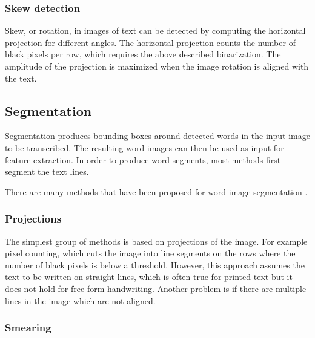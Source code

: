 \subsubsection{Skew detection}

Skew, or rotation, in images of text can be detected by computing the horizontal projection for different angles. The horizontal projection counts the number of black pixels per row, which requires the above described binarization. The amplitude of the projection is maximized when the image rotation is aligned with the text.

%
%
%
%

\subsection{Segmentation}

Segmentation produces bounding boxes around detected words in the input image to be transcribed. The resulting word images can then be used as input for feature extraction. In order to produce word segments, most methods first segment the text lines.

There are many methods that have been proposed for word image segmentation \cite{HWR_survey, Waterflow2011, Waterflow2015}.

\subsubsection{Projections}

The simplest group of methods is based on projections of the image. For example pixel counting, which cuts the image into line segments on the rows where the number of black pixels is below a threshold. However, this approach assumes the text to be written on straight lines, which is often true for printed text but it does not hold for free-form handwriting. Another problem is if there are multiple lines in the image which are not aligned.

\subsubsection{Smearing}

